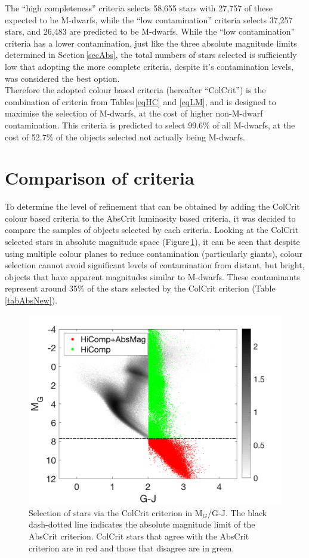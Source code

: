 The ``high completeness'' criteria selects 58,655 stars with 27,757 of these expected to be M-dwarfs, while the ``low contamination'' criteria selects 37,257 stars, and 26,483 are predicted to be M-dwarfs. While the ``low contamination'' criteria has a lower contamination, just like the three absolute magnitude limits determined in Section\,\ref{secAbs}, the total numbers of stars selected is sufficiently low that adopting the more complete criteria, despite it's contamination levels, was considered the best option.\\

Therefore the adopted colour based criteria (hereafter ``ColCrit'') is the combination of criteria from Tables\,\ref{eqHC} and \ref{eqLM}, and is designed to maximise the selection of M-dwarfs, at the cost of higher non-M-dwarf contamination. This criteria is predicted to select 99.6\% of all M-dwarfs, at the cost of 52.7\% of the objects selected not actually being M-dwarfs.
\section{Comparison of criteria}
\label{secCombined}
To determine the level of refinement that can be obtained by adding the ColCrit colour based criteria to the AbsCrit luminosity based criteria, it was decided to compare the samples of objects selected by each criteria. Looking at the ColCrit selected stars in absolute magnitude space (Figure\,\ref{figHiCompNew}), it can be seen that despite using multiple colour planes to reduce contamination (particularly giants), colour selection cannot avoid significant levels of contamination from distant, but bright, objects that have apparent magnitudes similar to M-dwarfs. These contaminants represent around 35\% of the stars selected by the ColCrit criterion (Table\,\ref{tabAbsNew}).\\
\begin{figure}
\centering
\includegraphics[width=1\textwidth]{AbsColour.png}
\caption{Selection of stars via the ColCrit criterion in M$_G$/G-J. The black dash-dotted line indicates the absolute magnitude limit of the AbsCrit criterion. ColCrit stars that agree with the AbsCrit criterion are in red and those that disagree are in green.}
\label{figHiCompNew}
\end{figure}

